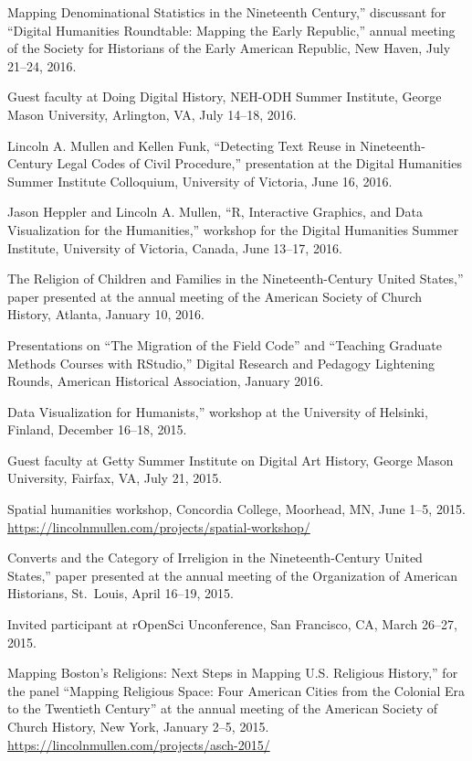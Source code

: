 \documentclass[11pt]{article}
\begin{document}
\noindent{}Mapping Denominational Statistics in the Nineteenth Century,'' discussant for ``Digital Humanities Roundtable: Mapping the Early Republic,'' annual meeting of the Society for Historians of the Early American Republic, New Haven, July 21--24, 2016.

Guest faculty at Doing Digital History, NEH-ODH Summer Institute, George Mason University, Arlington, VA, July 14--18, 2016.

Lincoln A. Mullen and Kellen Funk, ``Detecting Text Reuse in Nineteenth-Century Legal Codes of Civil Procedure,'' presentation at the Digital Humanities Summer Institute Colloquium, University of Victoria, June 16, 2016.

Jason Heppler and Lincoln A. Mullen, ``R, Interactive Graphics, and Data Visualization for the Humanities,'' workshop for the Digital Humanities Summer Institute, University of Victoria, Canada, June 13--17, 2016.  

\noindent{}The Religion of Children and Families in the Nineteenth-Century United States,'' paper presented at the annual meeting of the American Society of Church History, Atlanta, January 10, 2016.

Presentations on ``The Migration of the Field Code'' and ``Teaching Graduate Methods Courses with RStudio,'' Digital Research and Pedagogy Lightening Rounds, American Historical Association, January 2016.

\noindent{}Data Visualization for Humanists,'' workshop at the University of Helsinki, Finland, December 16--18, 2015. 

Guest faculty at Getty Summer Institute on Digital Art History, George Mason University, Fairfax, VA, July 21, 2015.

Spatial humanities workshop, Concordia College, Moorhead, MN, June 1--5, 2015. \url{https://lincolnmullen.com/projects/spatial-workshop/}

\noindent{}Converts and the Category of Irreligion in the Nineteenth-Century United States,'' paper presented at the annual meeting of the Organization of American Historians, St.~Louis, April 16--19, 2015.

Invited participant at rOpenSci Unconference, San Francisco, CA, March 26--27, 2015.

\noindent{}Mapping Boston's Religions: Next Steps in Mapping U.S. Religious History,'' for the panel ``Mapping Religious Space: Four American Cities from the Colonial Era to the Twentieth Century'' at the annual meeting of the American Society of Church History, New York, January 2--5, 2015.  
\url{https://lincolnmullen.com/projects/asch-2015/}
\end{document}
